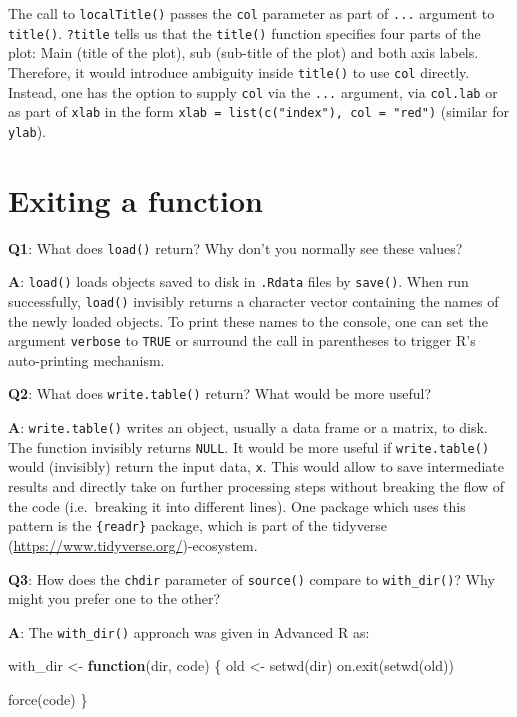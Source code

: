 \documentclass[
]{krantz}
\makeatletter
\newenvironment{Shaded}{\begin{snugshade}}{\end{snugshade}}
\newcommand{\ControlFlowTok}[1]{\textcolor[rgb]{0.13,0.29,0.53}{\textbf{#1}}}
\newcommand{\KeywordTok}[1]{\textcolor[rgb]{0.13,0.29,0.53}{\textbf{#1}}}
\newcommand{\NormalTok}[1]{#1}
\newcommand{\StringTok}[1]{\textcolor[rgb]{0.31,0.60,0.02}{#1}}
\renewcommand{\href}[2]{#2 (\url{#1})}
\newenvironment{kframe}{%
\medskip{}
\setlength{\fboxsep}{.8em}
 \def\at@end@of@kframe{}%
 \ifinner\ifhmode%
  \def\at@end@of@kframe{\end{minipage}}%
  \begin{minipage}{\columnwidth}%
 \fi\fi%
 \def\FrameCommand##1{\hskip\@totalleftmargin \hskip-\fboxsep
 \colorbox{shadecolor}{##1}\hskip-\fboxsep
     \hskip-\linewidth \hskip-\@totalleftmargin \hskip\columnwidth}%
 \MakeFramed {\advance\hsize-\width
   \@totalleftmargin\z@ \linewidth\hsize
   \@setminipage}}%
 {\par\unskip\endMakeFramed%
 \at@end@of@kframe}
\renewenvironment{Shaded}{\begin{kframe}}{\end{kframe}}
\renewcommand{\KeywordTok} [1]{\textcolor[rgb]{0.00,0.44,0.13}{{#1}}}
\renewcommand{\StringTok}  [1]{\textcolor[rgb]{0.25,0.44,0.63}{{#1}}}
\renewcommand{\NormalTok}  [1]{{#1}}
\makeatother
\begin{document}
The call to \texttt{localTitle()} passes the \texttt{col} parameter as part of \texttt{...} argument to \texttt{title()}. \texttt{?title} tells us that the \texttt{title()} function specifies four parts of the plot: Main (title of the plot), sub (sub-title of the plot) and both axis labels. Therefore, it would introduce ambiguity inside \texttt{title()} to use \texttt{col} directly. Instead, one has the option to supply \texttt{col} via the \texttt{...} argument, via \texttt{col.lab} or as part of \texttt{xlab} in the form \texttt{xlab\ =\ list(c("index"),\ col\ =\ "red")} (similar for \texttt{ylab}).

\hypertarget{exiting-a-function}{%
\section{Exiting a function}\label{exiting-a-function}}

\textbf{{Q1}}: What does \texttt{load()} return? Why don't you normally see these values?

\textbf{{A}}: \texttt{load()} loads objects saved to disk in \texttt{.Rdata} files by \texttt{save()}. When run successfully, \texttt{load()} invisibly returns a character vector containing the names of the newly loaded objects. To print these names to the console, one can set the argument \texttt{verbose} to \texttt{TRUE} or surround the call in parentheses to trigger R's auto-printing mechanism.

\textbf{{Q2}}: What does \texttt{write.table()} return? What would be more useful?

\textbf{{A}}: \texttt{write.table()} writes an object, usually a data frame or a matrix, to disk. The function invisibly returns \texttt{NULL}. It would be more useful if \texttt{write.table()} would (invisibly) return the input data, \texttt{x}. This would allow to save intermediate results and directly take on further processing steps without breaking the flow of the code (i.e.~breaking it into different lines). One package which uses this pattern is the \texttt{\{readr\}} package, which is part of the \href{https://www.tidyverse.org/}{tidyverse}-ecosystem.

\textbf{{Q3}}: How does the \texttt{chdir} parameter of \texttt{source()} compare to \texttt{with\_dir()}? Why might you prefer one to the other?

\textbf{{A}}: The \texttt{with\_dir()} approach was given in Advanced R as:

\begin{Shaded}
\begin{Highlighting}[]
\NormalTok{with_dir <-}\StringTok{ }\ControlFlowTok{function}\NormalTok{(dir, code) \{}
\NormalTok{  old <-}\StringTok{ }\KeywordTok{setwd}\NormalTok{(dir)}
  \KeywordTok{on.exit}\NormalTok{(}\KeywordTok{setwd}\NormalTok{(old))}
  
  \KeywordTok{force}\NormalTok{(code)}
\NormalTok{\}}
\end{Highlighting}
\end{Shaded}
\end{document}
